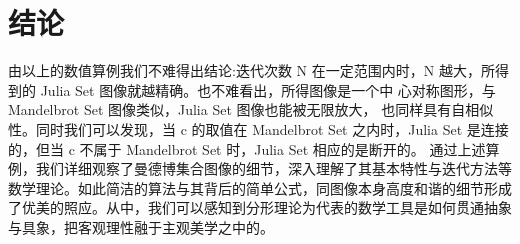\section{结论}
由以上的数值算例我们不难得出结论:迭代次数 N 在一定范围内时，N 越大，所得到的 Julia Set 图像就越精确。也不难看出，所得图像是一个中 心对称图形，与 Mandelbrot Set 图像类似，Julia Set 图像也能被无限放大， 也同样具有自相似性。同时我们可以发现，当 c 的取值在 Mandelbrot Set 之内时，Julia Set 是连接的，但当 c 不属于 Mandelbrot Set 时，Julia Set 相应的是断开的。
通过上述算例，我们详细观察了曼德博集合图像的细节，深入理解了其基本特性与迭代方法等数学理论。如此简洁的算法与其背后的简单公式，同图像本身高度和谐的细节形成了优美的照应。从中，我们可以感知到分形理论为代表的数学工具是如何贯通抽象与具象，把客观理性融于主观美学之中的。
